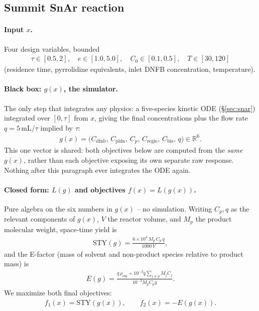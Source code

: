 \documentclass[11pt]{article}
\begin{document}
\subsection{Summit SnAr reaction}

\paragraph{Input $x$.} Four design variables, bounded
\begin{align}
\tau \in [0.5, 2], \quad e \in [1.0, 5.0], \quad C_0 \in [0.1, 0.5],
\quad T \in [30, 120]
\end{align}
(residence time, pyrrolidine equivalents, inlet DNFB concentration,
temperature).

\paragraph{Black box: $g(x)$, the simulator.} The only step that
integrates any physics: a five-species kinetic ODE (\S\ref{sec:snar})
integrated over $[0,\tau]$ from $x$, giving the final concentrations
plus the flow rate $q = 5\,\mathrm{mL}/\tau$ implied by $\tau$:
\begin{align}
g(x) = \big(C_{\mathrm{dfnb}},\, C_{\mathrm{pldn}},\, C_p,\,
C_{\mathrm{regio}},\, C_{\mathrm{bis}},\, q\big) \in \mathbb{R}^6.
\end{align}
This one vector is shared: both objectives below are computed from the
\emph{same} $g(x)$, rather than each objective exposing its own separate
raw response. Nothing after this paragraph ever integrates the ODE
again.

\paragraph{Closed form: $L(g)$ and objectives $f(x) = L(g(x))$.} Pure
algebra on the six numbers in $g(x)$ -- no simulation. Writing $C_p, q$
as the relevant components of $g(x)$, $V$ the reactor volume, and $M_p$
the product molecular weight, space-time yield is
\begin{align}
\mathrm{STY}(g) = \frac{6\times10^4\, M_p\, C_p\, q}{1000\, V},
\end{align}
and the E-factor (mass of solvent and non-product species relative to
product mass) is
\begin{align}
E(g) = \frac{q\,\rho_{\mathrm{eth}} + 10^{-3} q \sum_{j \ne p} M_j C_j}{10^{-3} M_p C_p q}.
\end{align}
We maximize both final objectives:
\begin{align}
f_1(x) = \mathrm{STY}(g(x)), \qquad f_2(x) = -E(g(x)).
\end{align}
\end{document}
